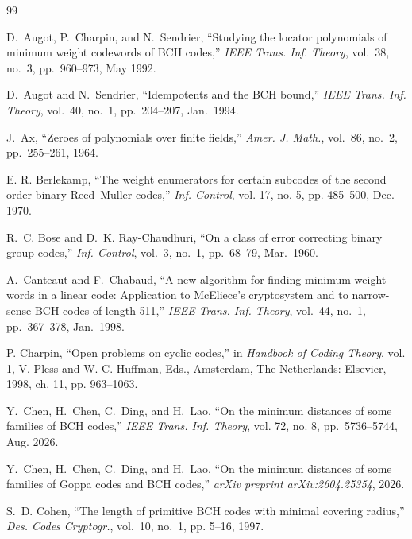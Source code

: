 \documentclass[journal,onecolumn]{IEEEtran}
\begin{document}
\begin{thebibliography}{99}

D.~Augot, P.~Charpin, and N.~Sendrier,
``Studying the locator polynomials of minimum weight codewords of
BCH codes,''
\emph{IEEE Trans. Inf. Theory},
vol.~38, no.~3, pp.~960--973, May 1992.



D.~Augot and N.~Sendrier,
``Idempotents and the BCH bound,''
\emph{IEEE Trans. Inf. Theory},
vol.~40, no.~1, pp.~204--207, Jan.~1994.


J.~Ax, ``Zeroes of polynomials over finite fields,'' \emph{Amer. J. Math.}, vol.~86, no.~2, pp.~255--261, 1964.





E. R. Berlekamp, ``The weight enumerators for certain subcodes of the
second order binary Reed--Muller codes,'' \emph{Inf. Control},
vol. 17, no. 5, pp. 485--500,  Dec. 1970.


R.~C. Bose and D.~K. Ray-Chaudhuri,
``On a class of error correcting binary group codes,''
\emph{Inf. Control}, vol.~3, no.~1, pp.~68--79, Mar.~1960.




A.~Canteaut and F.~Chabaud,
``A new algorithm for finding minimum-weight words in a linear code:
Application to McEliece's cryptosystem and to narrow-sense BCH codes
of length 511,''
\emph{IEEE Trans. Inf. Theory},
vol.~44, no.~1, pp.~367--378, Jan.~1998.


 P. Charpin, ``Open problems on cyclic codes,'' in {\em Handbook of Coding Theory}, vol. 1, V. Pless and W. C. Huffman, Eds.,  Amsterdam,
The Netherlands: Elsevier, 1998, ch. 11, pp. 963--1063.





Y.~Chen, H.~Chen, C.~Ding, and H.~Lao,
``On the minimum distances of some families of BCH codes,''
\emph{IEEE Trans. Inf. Theory}, vol. 72, no.  8, pp.~5736--5744,  Aug. 2026.

Y.~Chen, H.~Chen, C.~Ding, and H.~Lao,
``On the minimum distances of some families of Goppa codes and BCH codes,''
\emph{arXiv preprint arXiv:2604.25354}, 2026.

S.~D. Cohen, ``The length of primitive {BCH} codes with minimal covering
  radius,'' \emph{Des. Codes Cryptogr.}, vol.~10, no.~1, pp. 5--16, 1997.


\end{thebibliography}
\end{document}
